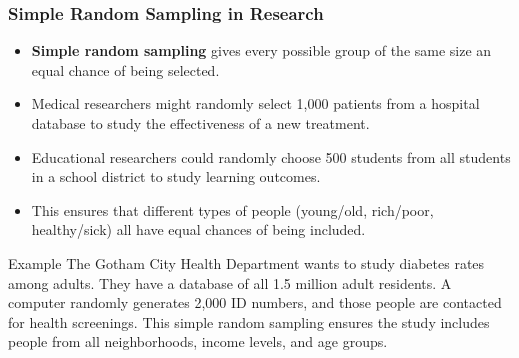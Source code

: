 \documentclass{beamer}
\begin{document}
	\begin{frame}
		\frametitle{Simple Random Sampling in Research}
		
		\begin{itemize}
			\item \textbf{Simple random sampling} gives every possible group of the same size an equal chance of being selected.
			\item Medical researchers might randomly select 1,000 patients from a hospital database to study the effectiveness of a new treatment.
			\item Educational researchers could randomly choose 500 students from all students in a school district to study learning outcomes.
			\item This ensures that different types of people (young/old, rich/poor, healthy/sick) all have equal chances of being included.
		\end{itemize}
		
		\begin{exampleblock}{Example}
			The Gotham City Health Department wants to study diabetes rates among adults. They have a database of all 1.5 million adult residents. A computer randomly generates 2,000 ID numbers, and those people are contacted for health screenings. This simple random sampling ensures the study includes people from all neighborhoods, income levels, and age groups.
		\end{exampleblock}
		
	\end{frame}
	
\end{document}
